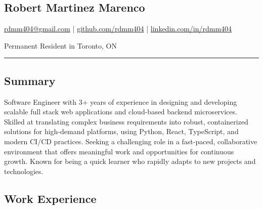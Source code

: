 \documentclass[a4paper,10pt]{article}
\begin{document}
\pagestyle{empty}

\begin{center}
  \section*{\LARGE Robert Martinez Marenco}
  \href{mailto:rdmm404@gmail.com}{rdmm404@gmail.com} |
  \href{https://github.com/rdmm404}{github.com/rdmm404} |
  \href{https://linkedin.com/in/rdmm404}{linkedin.com/in/rdmm404}

  Permanent Resident in Toronto, ON
\end{center}

\hrule
\vspace{4pt}

\subsection*{Summary}
Software Engineer with 3+ years of experience in designing and developing scalable full stack web applications
and cloud-based backend microservices. Skilled at translating complex business requirements into robust, containerized solutions
for high-demand platforms, using Python, React, TypeScript, and modern CI/CD practices. Seeking a challenging role in a fast-paced,
collaborative environment that offers meaningful work and opportunities for continuous growth. Known for being a quick learner
who rapidly adapts to new projects and technologies.

\subsection*{Work Experience}
\end{document}
